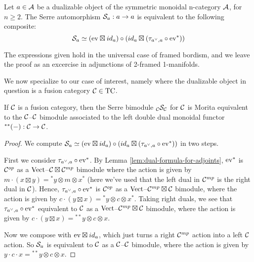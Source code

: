 \documentclass{amsart}
\begin{document}
\begin{proposition}
Let $a \in \mathcal A$ be a dualizable object of the symmetric monoidal n-category $\mathcal A$, for $n \geq 2$.  The Serre automorphism $\mathcal S_a : a \rightarrow a$ is equivalent to the following composite:
$$\mathcal S_a \simeq (\mathrm{ev} \boxtimes {id}_a) \circ ({id}_a \boxtimes (\tau_{a^\vee,a} \circ  \mathrm{ev}^*))$$
\end{proposition}

The expressions given hold in the universal case of framed bordism, and we leave the proof as an excercise in adjunctions of 2-framed 1-manifolds.

We now specialize to our case of interest, namely where the dualizable object in question is a fusion category $\mathcal C \in \mathrm{TC}$.


\begin{theorem} \label{thm-serre}
If $\mathcal C$ is a fusion category, then the Serre bimodule ${}_{\mathcal C} {\mathcal S}_{\mathcal C}$ for $\mathcal C$ is Morita equivalent to the $\mathcal C$--$\mathcal C$ bimodule associated to the left double dual monoidal functor ${}^{**}{(-)}: \mathcal C \rightarrow \mathcal C$.
\end{theorem}

\begin{proof}
We compute $\mathcal S_a \simeq (\mathrm{ev} \boxtimes {id}_a) \circ ({id}_a \boxtimes (\tau_{a^\vee,a} \circ  \mathrm{ev}^*))$ in two steps.  

First we consider $\tau_{a^\vee,a} \circ  \mathrm{ev}^*$.  By Lemma \ref{lem:dual-formula-for-adjoints}, $\mathrm{ev}^*$ is $\mathcal C^{{op}}$ as a $\mathrm{Vect}$--${\mathcal C \boxtimes \mathcal C^{{mp}}}$ bimodule where the action is given by $m\cdot (x \boxtimes y) = {}^*y \otimes m \otimes x^*$ (here we've used that the left dual in $\mathcal C^{{mp}}$ is the right dual in $\mathcal C$).  Hence, $\tau_{a^\vee,a} \circ  \mathrm{ev}^*$ is $\mathcal C^{op}$ as a $\mathrm{Vect}$--$\mathcal C^{mp} \boxtimes \mathcal C$ bimodule, where the action is given by $c \cdot (y \boxtimes x) =  {}^*y \otimes c \otimes x^*$.  Taking right duals, we see that $\tau_{a^\vee,a} \circ  \mathrm{ev}^*$ equivalent to $\mathcal C$ as a $\mathrm{Vect}$--$\mathcal C^{mp} \boxtimes \mathcal C$ bimodule, where the action is given by $c \cdot (y \boxtimes x) =  {}^{**}y \otimes c \otimes x$.

Now we compose with $\mathrm{ev} \boxtimes {id}_a$, which just turns a right $\mathcal C^{{mp}}$ action into a left $\mathcal C$ action.  So $\mathcal S_a$ is equivalent to $\mathcal C$ as a  $\mathcal C$--$\mathcal C$ bimodule, where the action is given by $y \cdot c \cdot x=  {}^{**}y \otimes c \otimes x$.
\end{proof}
\end{document}
